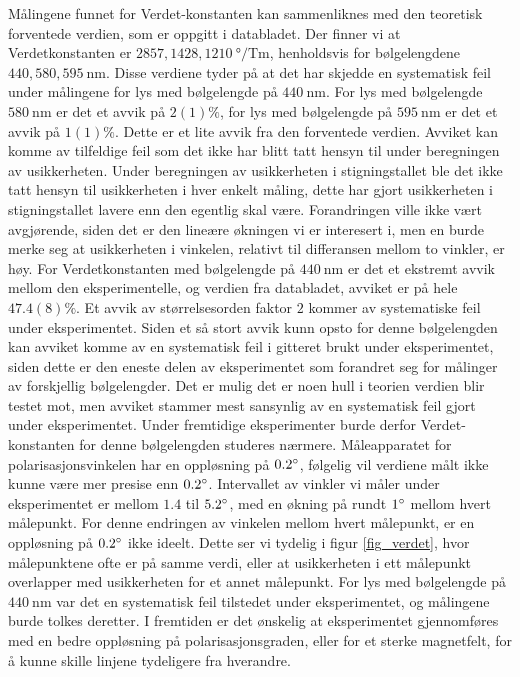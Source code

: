 \documentclass[%
 reprint,
 amsmath,amssymb,
 aps,
 norsk,
]{revtex4-1}
\begin{document}
Målingene funnet for Verdet-konstanten kan sammenliknes med den teoretisk forventede verdien, som er oppgitt i databladet. Der finner vi at Verdetkonstanten er $2857, 1428, \SI{1210}{\degree/\tesla\meter}$, henholdsvis for bølgelengdene $440, 580, \SI{595}{\nano\meter}$. Disse verdiene tyder på at det har skjedde en systematisk feil under målingene for lys med bølgelengde på $\SI{440}{\nano\meter}$. For lys med bølgelengde $\SI{580}{\nano\meter}$ er det et avvik på $2(1)\%$, for lys med bølgelengde på $\SI{595}{\nano\meter}$ er det et avvik på $1(1)\%$. Dette er et lite avvik fra den forventede verdien. Avviket kan komme av tilfeldige feil som det ikke har blitt tatt hensyn til under beregningen av usikkerheten. Under beregningen av usikkerheten i stigningstallet ble det ikke tatt hensyn til usikkerheten i hver enkelt måling, dette har gjort usikkerheten i stigningstallet lavere enn den egentlig skal være. Forandringen ville ikke vært avgjørende, siden det er den lineære økningen vi er interesert i, men en burde merke seg at usikkerheten i vinkelen, relativt til differansen mellom to vinkler, er høy.
For Verdetkonstanten med bølgelengde på $\SI{440}{\nano\meter}$ er det et ekstremt avvik mellom den eksperimentelle, og verdien fra databladet, avviket er på hele $47.4(8)\%$. Et avvik av størrelsesorden faktor $2$ kommer av systematiske feil under eksperimentet. Siden et så stort avvik kunn opsto for denne bølgelengden kan avviket komme av en systematisk feil i gitteret brukt under eksperimentet, siden dette er den eneste delen av eksperimentet som forandret seg for målinger av forskjellig bølgelengder. Det er mulig det er noen hull i teorien verdien blir testet mot, men avviket stammer mest sansynlig av en systematisk feil gjort under eksperimentet. Under fremtidige eksperimenter burde derfor Verdet-konstanten for denne bølgelengden studeres nærmere.
Måleapparatet for polarisasjonsvinkelen har en oppløsning på $0.2\degree$, følgelig vil verdiene målt ikke kunne være mer presise enn $0.2\degree$. Intervallet av vinkler vi måler under eksperimentet er mellom $1.4$ til $5.2\degree$, med en økning på rundt $1\degree$ mellom hvert målepunkt. For denne endringen av vinkelen mellom hvert målepunkt, er en oppløsning på $0.2\degree$ ikke ideelt. Dette ser vi tydelig i figur \vref{fig_verdet}, hvor målepunktene ofte er på samme verdi, eller at usikkerheten i ett målepunkt overlapper med usikkerheten for et annet målepunkt. For lys med bølgelengde på $\SI{440}{\nano\meter}$ var det en systematisk feil tilstedet under eksperimentet, og målingene burde tolkes deretter. I fremtiden er det ønskelig at eksperimentet gjennomføres med en bedre oppløsning på polarisasjonsgraden, eller for et sterke magnetfelt, for å kunne skille linjene tydeligere fra hverandre.\\
\end{document}
